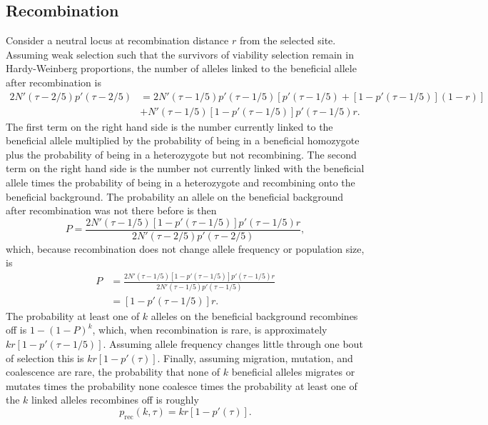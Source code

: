 \documentclass[]{article}
\begin{document}
\subsection*{Recombination}
%
Consider a neutral locus at recombination distance $r$ from the selected site.
Assuming weak selection such that the survivors of viability selection remain in Hardy-Weinberg proportions, the number of alleles linked to the beneficial allele after recombination is
\begin{equation}
\begin{aligned}
2 N'(\tau-2/5) p'(\tau-2/5) &= 2 N'(\tau-1/5) p'(\tau-1/5) \left[p'(\tau-1/5) + \left[1-p'(\tau-1/5) \right] (1-r) \right]\\
 &+  N'(\tau-1/5) [1-p'(\tau-1/5)] p'(\tau-1/5) r.
\end{aligned}
\end{equation}
The first term on the right hand side is the number currently linked to the beneficial allele multiplied by the probability of being in a beneficial homozygote plus the probability of being in a heterozygote but not recombining.
The second term on the right hand side is the number not currently linked with the beneficial allele times the probability of being in a heterozygote and recombining onto the beneficial background.
%
The probability an allele on the beneficial background after recombination was not there before is then
\begin{equation}
P = \frac{2 N'(\tau-1/5) [1-p'(\tau-1/5)] p'(\tau-1/5) r}{2 N'(\tau-2/5) p'(\tau-2/5)},
\end{equation}
which, because recombination does not change allele frequency or population size, is
\begin{equation}
\begin{aligned}
P &= \frac{2 N'(\tau-1/5) [1-p'(\tau-1/5)] p'(\tau-1/5) r}{2 N'(\tau-1/5) p'(\tau-1/5)}\\
&= [1-p'(\tau-1/5)] r.
\end{aligned}
\end{equation}
The probability at least one of $k$ alleles on the beneficial background recombines off is $1-(1-P)^k$, which, when recombination is rare, is approximately $k r [1-p'(\tau-1/5)]$.
Assuming allele frequency changes little through one bout of selection this is $k r [1-p'(\tau)]$.
Finally, assuming migration, mutation, and coalescence are rare, the probability that none of $k$ beneficial alleles migrates or mutates times the probability none coalesce times the probability at least one of the $k$ linked alleles recombines off is roughly \citep[table 1 in][]{hudson1988coalescent}
\begin{equation}
p_\mathrm{rec}(k,\tau) = k r [1-p'(\tau)].
\end{equation}
\end{document}

